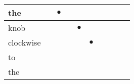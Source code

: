 \documentclass[landscape]{article}
\newcommand{\ssp}{\hspace{2pt}}
\newcommand{\mex}{\cellcolor{g}$\bullet$}
\begin{document}
\begin{tabular}{|l|p{10pt}|p{10pt}|p{10pt}|p{10pt}|p{10pt}|p{10pt}|p{10pt}|p{10pt}|p{10pt}|}
\hline
\ssp \cellcolor{ref1}the \ssp&\hspace{2pt}&\hspace{2pt}\mex&\hspace{2pt}&\hspace{2pt}&\hspace{2pt}&\hspace{2pt}&\hspace{2pt}&\hspace{2pt}&\hspace{2pt}\\
\hline
\ssp \cellcolor{ref3}knob \ssp&\hspace{2pt}&\hspace{2pt}&\hspace{2pt}&\hspace{2pt}\mex&\hspace{2pt}&\hspace{2pt}&\hspace{2pt}&\hspace{2pt}&\hspace{2pt}\\
\hline
\ssp \cellcolor{ref4}clockwise \ssp&\hspace{2pt}&\hspace{2pt}&\hspace{2pt}&\hspace{2pt}&\hspace{2pt}\mex&\hspace{2pt}&\hspace{2pt}&\hspace{2pt}&\hspace{2pt}\\
\hline
\ssp to \ssp&\hspace{2pt}&\hspace{2pt}&\hspace{2pt}&\hspace{2pt}&\hspace{2pt}&\hspace{2pt}&\hspace{2pt}&\hspace{2pt}&\hspace{2pt}\\
\hline
\ssp the \ssp&\hspace{2pt}&\hspace{2pt}&\hspace{2pt}&\hspace{2pt}&\hspace{2pt}&\hspace{2pt}&\hspace{2pt}&\hspace{2pt}&\hspace{2pt}\\

\end{tabular}
\end{document}
